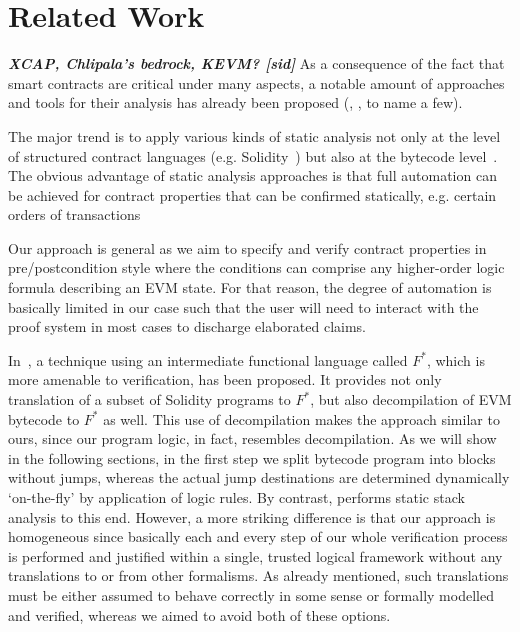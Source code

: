 \documentclass[sigplan,10pt,review]{acmart}\settopmatter{printfolios=true,printccs=false,printacmref=false}
\newcommand{\sid}[1]{\textit{\textbf{#1 [sid]}}}
\begin{document}
\section{Related Work}
\label{sec:rwork}

\sid{XCAP, Chlipala's bedrock, KEVM?}
As a consequence of the fact that smart contracts are critical under many aspects, a notable amount of
approaches and tools for their analysis has already been proposed 
(\cite{Bhargavan:2016:FVS:2993600.2993611}, \cite{securify}, \cite{openzeppelin} to name a few).
 
The major trend is to apply various kinds of static analysis not only at the level of structured contract
languages (e.g. Solidity~\cite{openzeppelin}) but also at the bytecode level~\cite{securify}. 
%
The obvious advantage of static analysis approaches is that full automation can be achieved for 
contract properties that can be confirmed statically, e.g. certain orders of transactions \cite{securify} 
 
Our approach is general as we aim to specify and verify contract properties in pre/postcondition
style where the conditions can comprise any higher-order logic formula describing an EVM state. 
For that reason, the degree of automation is basically limited in our case such that the user will need to interact 
with the proof system in most cases to discharge elaborated claims. 

In~\cite{Bhargavan:2016:FVS:2993600.2993611}, a technique using an intermediate functional language
called $F^*$, which is more amenable to verification, has been proposed. 
It provides not only translation of a subset of Solidity programs 
to $F^*$, but also decompilation of EVM bytecode to $F^*$ as well. This use of decompilation makes
the approach similar to ours, since our program logic, in fact, resembles decompilation.
As we will show in the following sections, in the first step we split bytecode program into blocks without jumps,  
whereas the actual jump destinations are determined dynamically `on-the-fly' by application of logic rules.
By contrast, \cite{Bhargavan:2016:FVS:2993600.2993611} performs static stack analysis to this end.
However, a more striking difference is that our approach is homogeneous since basically each and every step of our whole verification process 
is performed and justified within a single, trusted logical framework without any translations to or from other formalisms.
As already mentioned, such translations must be either assumed to behave correctly in some sense or 
formally modelled and verified,
whereas we aimed to avoid both of these options. 
%   
\end{document}
